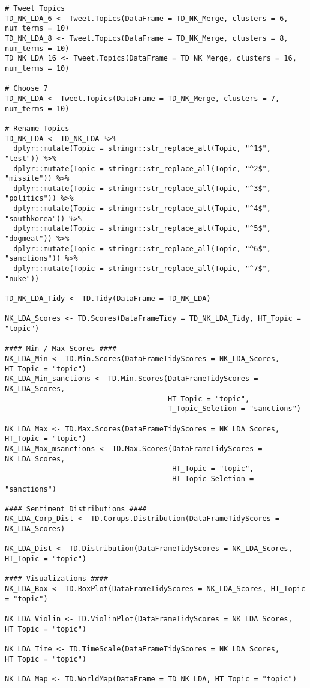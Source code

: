 \begin{lstlisting}
# Tweet Topics
TD_NK_LDA_6 <- Tweet.Topics(DataFrame = TD_NK_Merge, clusters = 6, num_terms = 10)
TD_NK_LDA_8 <- Tweet.Topics(DataFrame = TD_NK_Merge, clusters = 8, num_terms = 10)
TD_NK_LDA_16 <- Tweet.Topics(DataFrame = TD_NK_Merge, clusters = 16, num_terms = 10)

# Choose 7
TD_NK_LDA <- Tweet.Topics(DataFrame = TD_NK_Merge, clusters = 7, num_terms = 10)

# Rename Topics
TD_NK_LDA <- TD_NK_LDA %>% 
  dplyr::mutate(Topic = stringr::str_replace_all(Topic, "^1$", "test")) %>% 
  dplyr::mutate(Topic = stringr::str_replace_all(Topic, "^2$", "missile")) %>% 
  dplyr::mutate(Topic = stringr::str_replace_all(Topic, "^3$", "politics")) %>% 
  dplyr::mutate(Topic = stringr::str_replace_all(Topic, "^4$", "southkorea")) %>% 
  dplyr::mutate(Topic = stringr::str_replace_all(Topic, "^5$", "dogmeat")) %>% 
  dplyr::mutate(Topic = stringr::str_replace_all(Topic, "^6$", "sanctions")) %>% 
  dplyr::mutate(Topic = stringr::str_replace_all(Topic, "^7$", "nuke")) 

TD_NK_LDA_Tidy <- TD.Tidy(DataFrame = TD_NK_LDA)

NK_LDA_Scores <- TD.Scores(DataFrameTidy = TD_NK_LDA_Tidy, HT_Topic = "topic")

#### Min / Max Scores #### 
NK_LDA_Min <- TD.Min.Scores(DataFrameTidyScores = NK_LDA_Scores, HT_Topic = "topic")
NK_LDA_Min_sanctions <- TD.Min.Scores(DataFrameTidyScores = NK_LDA_Scores, 
                                      HT_Topic = "topic", 
                                      T_Topic_Seletion = "sanctions")

NK_LDA_Max <- TD.Max.Scores(DataFrameTidyScores = NK_LDA_Scores, HT_Topic = "topic")
NK_LDA_Max_msanctions <- TD.Max.Scores(DataFrameTidyScores = NK_LDA_Scores, 
                                       HT_Topic = "topic", 
                                       HT_Topic_Seletion = "sanctions")

#### Sentiment Distributions ####
NK_LDA_Corp_Dist <- TD.Corups.Distribution(DataFrameTidyScores = NK_LDA_Scores)

NK_LDA_Dist <- TD.Distribution(DataFrameTidyScores = NK_LDA_Scores, HT_Topic = "topic")

#### Visualizations ####
NK_LDA_Box <- TD.BoxPlot(DataFrameTidyScores = NK_LDA_Scores, HT_Topic = "topic")

NK_LDA_Violin <- TD.ViolinPlot(DataFrameTidyScores = NK_LDA_Scores, HT_Topic = "topic")

NK_LDA_Time <- TD.TimeScale(DataFrameTidyScores = NK_LDA_Scores, HT_Topic = "topic")

NK_LDA_Map <- TD.WorldMap(DataFrame = TD_NK_LDA, HT_Topic = "topic")

\end{lstlisting}
